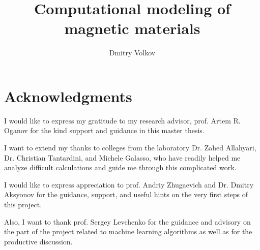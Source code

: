 \title{Computational modeling of magnetic materials}

\author{Dmitry Volkov}







\maketitle
\rusmaketitle

\setcounter{savepage}{\thepage}
\begin{abstractpage}

\end{abstractpage}

 \setcounter{page}{\thesavepage}
 \begin{abstractpagerus}
 
 \end{abstractpagerus}


\section*{\centering Acknowledgments}

I would like to express my gratitude to my research advisor, prof.  Artem R. Oganov for the kind support and guidance in this master thesis.

I want to extend my thanks to colleges from the laboratory Dr. Zahed Allahyari,  Dr. Christian Tantardini, and Michele Galasso,  who have readily helped me analyze difficult calculations and guide me through this complicated work.

I would like to express appreciation to prof.  Andriy Zhugaevich and Dr. Dmitry Aksyonov for the guidance, support, and useful hints on the very first steps of this project.

Also, I want to thank prof. Sergey Levchenko for the guidance and advisory on the part of the project related to machine learning algorithms as well as for the productive discussion. 
